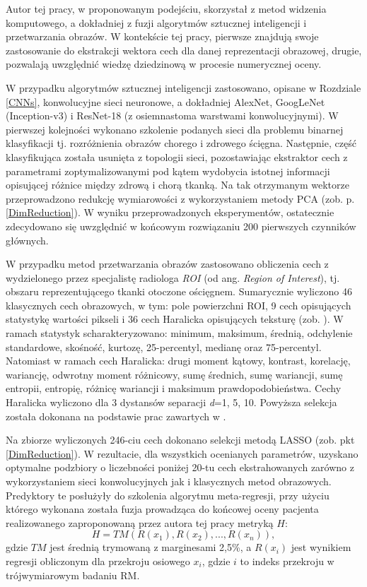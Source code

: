 Autor tej pracy, w proponowanym podejściu, skorzystał z metod widzenia komputowego, a dokładniej z fuzji algorytmów sztucznej inteligencji i przetwarzania obrazów. W kontekście tej pracy, pierwsze znajdują swoje zastosowanie do ekstrakcji wektora cech dla danej reprezentacji obrazowej, drugie, pozwalają uwzględnić wiedzę dziedzinową w procesie numerycznej oceny.

W przypadku algorytmów sztucznej inteligencji zastosowano,  opisane w Rozdziale \ref{CNNs}, konwolucyjne sieci neuronowe, a dokładniej AlexNet, GoogLeNet (Inception-v3) i ResNet-18 (z osiemnastoma warstwami konwolucyjnymi). W pierwszej kolejności wykonano szkolenie podanych sieci dla problemu binarnej klasyfikacji tj. rozróżnienia obrazów chorego i zdrowego ścięgna. Następnie, część klasyfikująca została usunięta z topologii sieci, pozostawiając ekstraktor cech z parametrami zoptymalizowanymi pod kątem wydobycia istotnej informacji opisującej różnice między zdrową i chorą tkanką. Na tak otrzymanym wektorze przeprowadzono redukcję wymiarowości z wykorzystaniem metody PCA (zob. p. \ref{DimReduction}). W wyniku przeprowadzonych eksperymentów, ostatecznie zdecydowano się uwzględnić w końcowym rozwiązaniu 200 pierwszych czynników głównych.

W przypadku metod przetwarzania obrazów zastosowano obliczenia cech z wydzielonego przez specjalistę radiologa \textit{ROI} (od ang. \textit{Region of Interest}), tj. obszaru reprezentującego tkanki otoczone ościęgnem. Sumarycznie wyliczono 46 klasycznych cech obrazowych, w tym: pole powierzchni ROI, 9 cech opisujących statystykę wartości pikseli i 36 cech Haralicka opisujących teksturę (zob. \cite{Haralick1973}). W ramach statystyk scharakteryzowano: minimum, maksimum, średnią, odchylenie standardowe, skośność, kurtozę, 25-percentyl, medianę oraz 75-percentyl. Natomiast w ramach cech Haralicka: drugi moment kątowy, kontrast, korelację, wariancję, odwrotny moment różnicowy, sumę średnich, sumę wariancji, sumę entropii, entropię, różnicę wariancji i maksimum prawdopodobieństwa. Cechy Haralicka wyliczono dla 3 dystansów separacji \textit{d}=1, 5, 10. Powyższa selekcja została dokonana na podstawie prac zawartych w \cite{Nowosielski17}.  

Na zbiorze wyliczonych 246-ciu cech dokonano selekcji metodą LASSO (zob. pkt \ref{DimReduction}). W rezultacie, dla wszystkich ocenianych parametrów, uzyskano optymalne podzbiory o liczebności poniżej 20-tu cech ekstrahowanych zarówno z wykorzystaniem sieci konwolucyjnych jak i klasycznych metod obrazowych. Predyktory \linebreak te posłużyły do szkolenia algorytmu meta-regresji, przy użyciu którego wykonana została fuzja prowadząca do końcowej oceny pacjenta realizowanego zaproponowaną przez autora tej pracy metryką $H$:
\begin{equation}
\label{ecq:H}
H = TM(R(x_1), R(x_2),..., R(x_n)),
\end{equation}
gdzie $TM$ jest średnią trymowaną z marginesami 2,5\%, a $R(x_i)$ jest wynikiem regresji obliczonym dla przekroju osiowego $x_i$, gdzie $i$ to indeks przekroju w trójwymiarowym badaniu RM.

